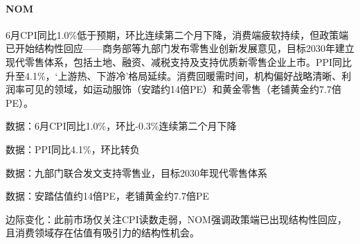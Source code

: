 \documentclass[11pt]{ctexart}
\begin{document}
\paragraph{NOM} 6月CPI同比1.0\%低于预期，环比连续第二个月下降，消费端疲软持续，但政策端已开始结构性回应——商务部等九部门发布零售业创新发展意见，目标2030年建立现代零售体系，包括土地、融资、减税支持及支持优质新零售企业上市。PPI同比升至4.1\%，‘上游热、下游冷’格局延续。消费回暖需时间，机构偏好战略清晰、利润率可见的领域，如运动服饰（安踏约14倍PE）和黄金零售（老铺黄金约7.7倍PE）。
{\small\color{refgray}数据：6月CPI同比1.0\%，环比-0.3\%连续第二个月下降\par}
{\small\color{refgray}数据：PPI同比4.1\%，环比转负\par}
{\small\color{refgray}数据：九部门联合发文支持零售业，目标2030年现代零售体系\par}
{\small\color{refgray}数据：安踏估值约14倍PE，老铺黄金约7.7倍PE\par}
{\small\color{refgray}边际变化：此前市场仅关注CPI读数走弱，NOM强调政策端已出现结构性回应，且消费领域存在估值有吸引力的结构性机会。\par}
\end{document}

